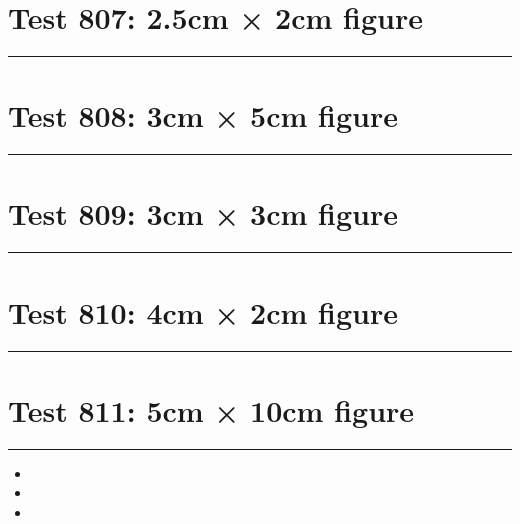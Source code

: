 \documentclass[a4paper,11pt]{article}
\begin{document}
\section*{Test 807: 2.5cm × 2cm figure}
\begin{swarmwrap}%
  \begin{minipage}[t]{2cm}
    \centering
    \rule{\linewidth}{2cm}
  \end{minipage}%
\end{swarmwrap}%
\swarmwrapnext
\lipsum[59]
\lipsum[60]
\lipsum[61]
\lipsum[62]
\lipsum[63]
\lipsum[64]
\section*{Test 808: 3cm × 5cm figure}
\begin{swarmwrap}%
  \begin{minipage}[t]{3cm}
    \centering
    \rule{\linewidth}{5cm}
  \end{minipage}%
\end{swarmwrap}%
\swarmwrapnext
\lipsum[83]
\lipsum[84]
\lipsum[85]
\lipsum[86]
\lipsum[87]
\lipsum[88]
\section*{Test 809: 3cm × 3cm figure}
\begin{swarmwrap}%
  \begin{minipage}[t]{3cm}
    \centering
    \rule{\linewidth}{3cm}
  \end{minipage}%
\end{swarmwrap}%
\swarmwrapnext
\lipsum[32]
\lipsum[33]
\lipsum[34]
\lipsum[35]
\lipsum[36]
\section*{Test 810: 4cm × 2cm figure}
\begin{swarmwrap}%
  \begin{minipage}[t]{4cm}
    \centering
    \rule{\linewidth}{2cm}
  \end{minipage}%
\end{swarmwrap}%
\swarmwrapnext
\lipsum[59]
\lipsum[60]
\lipsum[61]
\lipsum[62]
\section*{Test 811: 5cm × 10cm figure}
\begin{swarmwrap}%
  \begin{minipage}[t]{5cm}
    \centering
    \rule{\linewidth}{10cm}
  \end{minipage}%
\end{swarmwrap}
\begin{itemize}
  \item \swarmwrapnext\lipsum[103][1-4]
  \item \lipsum[105][1-3]
  \item \lipsum[106][1-3]
\end{itemize}
\end{document}
